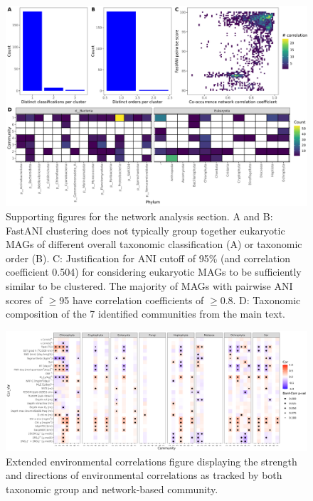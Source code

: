 \documentclass[12pt]{article}
\numberwithin{equation}{section}
\begin{document}
\begin{landscape}
    \begin{figure}
        \centering
        \includegraphics[width=0.95\columnwidth]{si-figures/network_supporting.png}
        \caption{Supporting figures for the network analysis section. A and B: FastANI clustering does not typically group together eukaryotic MAGs of different overall taxonomic classification (A) or taxonomic order (B). C: Justification for ANI cutoff of 95\% (and correlation coefficient 0.504) for considering eukaryotic MAGs to be sufficiently similar to be clustered. The majority of MAGs with pairwise ANI scores of $\geq$95 have correlation coefficients of $\geq$0.8. D: Taxonomic composition of the 7 identified communities from the main text.}
        \label{fig:network-support}
    \end{figure}
\end{landscape}

\begin{landscape}
    \begin{figure}
        \centering
        \includegraphics[width=0.95\columnwidth]{si-figures/bygroup.png}
        \caption{Extended environmental correlations figure displaying the strength and directions of environmental correlations as tracked by both taxonomic group and network-based community.}
        \label{fig:network-bygroup}
    \end{figure}
\end{landscape}
\end{document}
